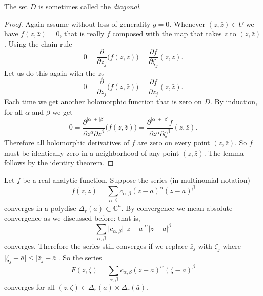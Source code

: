 \documentclass[12pt,openany]{book}
\newcommand{\sabs}[1]{\lvert {#1} \rvert}
\newcommand{\C}{{\mathbb{C}}}
\newcommand{\myindex}[1]{#1\index{#1}}
\theoremstyle{plain}
\theoremstyle{remark}
\theoremstyle{definition}
\theoremstyle{exercise}
\theoremstyle{example}
\begin{document}
The set $D$ is sometimes called the \emph{\myindex{diagonal}}.

\begin{proof}
Again assume without loss of generality $g=0$.
Whenever $(z,\bar{z}) \in U$ we have $f(z,\bar{z}) = 0$, that is really
$f$ composed with the map that takes $z$ to $(z,\bar{z})$.  Using the chain rule
\begin{equation*}
0 =
\frac{\partial}{\partial \bar{z}_j} \bigl(f(z,\bar{z})\bigr)
=
\frac{\partial f}{\partial \zeta_j}(z,\bar{z}) .
\end{equation*}
Let us do this again with the $z_j$
\begin{equation*}
0 =
\frac{\partial}{\partial z_j} \bigl(f(z,\bar{z})\bigr)
=
\frac{\partial f}{\partial z_j}(z,\bar{z}) .
\end{equation*}
Each time we get another holomorphic function that is zero on $D$.
By induction, for all $\alpha$ and $\beta$ we get
\begin{equation*}
0 =
\frac{\partial^{\sabs{\alpha}+\sabs{\beta}}}{\partial z^\alpha \partial \bar{z}^\beta} \bigl(f(z,\bar{z})\bigr)
=
\frac{\partial^{\sabs{\alpha}+\sabs{\beta}} f}{\partial z^\alpha \partial
\zeta^\beta}(z,\bar{z}) .
\end{equation*}
Therefore all holomorphic derivatives of $f$ are zero on every point
$(z,\bar{z})$.  So $f$ must be identically zero in a neighborhood of any
point $(z,\bar{z})$.  The lemma follows by the identity
theorem.
\end{proof}

Let $f$ be a real-analytic function.  Suppose 
the series (in multinomial notation)
\begin{equation*}
f(z,\bar{z}) =
\sum_{\alpha,\beta} c_{\alpha,\beta} {(z-a)}^\alpha
{(\bar{z}-\bar{a})}^\beta
\end{equation*}
converges in a polydisc $\Delta_r(a) \subset \C^n$.
By convergence we mean absolute
convergence as we discussed before: that is,
\begin{equation*}
\sum_{\alpha,\beta} \sabs{c_{\alpha,\beta}} \, \sabs{z-a}^\alpha
\sabs{\bar{z}-\bar{a}}^\beta
\end{equation*}
converges.
Therefore the series still converges if we replace $\bar{z}_j$  with
$\zeta_j$ where $\sabs{\zeta_j-\bar{a}} \leq \sabs{\bar{z}_j-\bar{a}}$.
So the series
\begin{equation*}
F(z,\zeta) =
\sum_{\alpha,\beta} c_{\alpha,\beta} {(z-a)}^\alpha
{(\zeta-\bar{a})}^\beta
\end{equation*}
converges for all $(z,\zeta) \in \Delta_r(a) \times \Delta_r(\bar{a})$.
\end{document}
